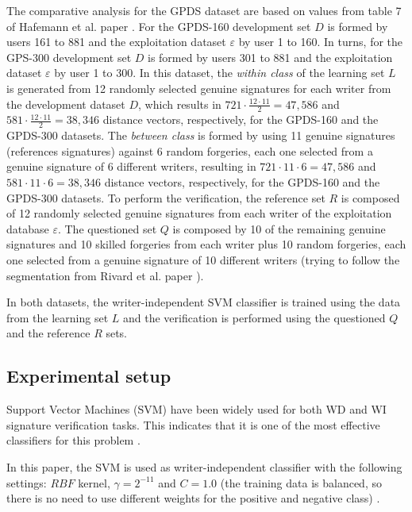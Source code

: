\documentclass[conference]{IEEEtran}
\begin{document}
The comparative analysis for the GPDS dataset are based on values from table 7 of Hafemann et al. paper \cite{hafemann:17}. 
For the GPDS-160 development set $D$ is formed by users 161 to 881 and the exploitation dataset $\varepsilon$ by user 1 to 160.
In turns, for the GPS-300 development set $D$ is formed by users 301 to 881 and the exploitation dataset $\varepsilon$ by user 1 to 300.
In this dataset, the \textit{within class} of the learning set $L$ is generated from 12 randomly selected genuine signatures for each writer from the development dataset $D$, which results in $721 \cdot \frac{12 \cdot 11}{2} = 47,586$ and $581 \cdot \frac{12 \cdot 11}{2} = 38,346$ distance vectors, respectively, for the GPDS-160 and the GPDS-300 datasets.
The \textit{between class} is formed by using 11 genuine signatures (references signatures) against 6 random forgeries, each one selected from a genuine signature of 6 different writers, resulting in $721 \cdot 11 \cdot 6 = 47,586$ and $581 \cdot 11 \cdot 6 = 38,346$ distance vectors, respectively, for the GPDS-160 and the GPDS-300 datasets. To perform the verification, the reference set $R$ is composed of 12 randomly selected genuine signatures from each writer of the exploitation database $\varepsilon$. The questioned set $Q$ is composed by 10 of the remaining genuine signatures and 10 skilled forgeries from each writer plus 10 random forgeries, each one selected from a genuine signature of 10 different writers (trying to follow the segmentation from Rivard et al. paper \cite{rivard:13}). 

In both datasets, the writer-independent SVM classifier is trained using the data from the learning set $L$ and the verification is performed using the questioned $Q$ and the reference $R$ sets.

\subsection{Experimental setup}

Support Vector Machines (SVM) have been widely used for both WD and WI signature verification tasks. This indicates that it is one of the most effective classifiers for this problem \cite{hafemann_review:17}.

In this paper, the SVM is used as writer-independent classifier with the following settings: $RBF$ kernel, $\gamma = 2^{-11}$ and $C=1.0$ (the training data is balanced, so there is no need to use different weights for the positive and negative class) \cite{hafemann:17}. 
\end{document}

